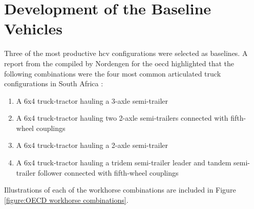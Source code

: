 \chapter{Development of the Baseline Vehicles}\label{chapter:baseline-vehicles}

Three of the most productive \gls{hcv} configurations were selected as baselines. A report from the compiled by Nordengen for the \gls{oecd} highlighted that the following combinations were the four most common articulated truck configurations in South Africa \cite{Nordengen2008}:

\begin{enumerate}
	\item A 6x4 truck-tractor hauling a 3-axle semi-trailer
	\item A 6x4 truck-tractor hauling two 2-axle semi-trailers connected with fifth-wheel couplings
	\item A 6x4 truck-tractor hauling a 2-axle semi-trailer
	\item A 6x4 truck-tractor hauling a tridem semi-trailer leader and tandem semi-trailer follower connected with fifth-wheel couplings
\end{enumerate}

Illustrations of each of the workhorse combinations are included in Figure \ref{figure:OECD workhorse combinations}.

